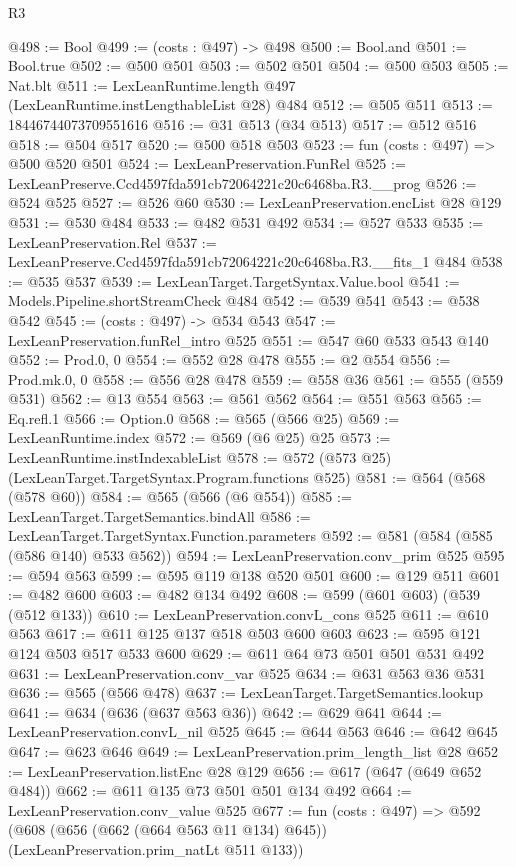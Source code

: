 \begin{lexlean}{R3}
\begin{coremodule}
@498 := Bool
@499 := (costs : @497) -> @498
@500 := Bool.and
@501 := Bool.true
@502 := @500 @501
@503 := @502 @501
@504 := @500 @503
@505 := Nat.blt
@511 := LexLeanRuntime.length @497 (LexLeanRuntime.instLengthableList @28) @484
@512 := @505 @511
@513 := 18446744073709551616
@516 := @31 @513 (@34 @513)
@517 := @512 @516
@518 := @504 @517
@520 := @500 @518 @503
@523 := fun (costs : @497) => @500 @520 @501
@524 := LexLeanPreservation.FunRel
@525 := LexLeanPreserve.Ccd4597fda591cb72064221c20c6468ba.R3.__prog
@526 := @524 @525
@527 := @526 @60
@530 := LexLeanPreservation.encList @28 @129
@531 := @530 @484
@533 := @482 @531 @492
@534 := @527 @533
@535 := LexLeanPreservation.Rel
@537 := LexLeanPreserve.Ccd4597fda591cb72064221c20c6468ba.R3.__fits_1 @484
@538 := @535 @537
@539 := LexLeanTarget.TargetSyntax.Value.bool
@541 := Models.Pipeline.shortStreamCheck @484
@542 := @539 @541
@543 := @538 @542
@545 := (costs : @497) -> @534 @543
@547 := LexLeanPreservation.funRel_intro @525
@551 := @547 @60 @533 @543 @140
@552 := Prod.{0, 0}
@554 := @552 @28 @478
@555 := @2 @554
@556 := Prod.mk.{0, 0}
@558 := @556 @28 @478
@559 := @558 @36
@561 := @555 (@559 @531)
@562 := @13 @554
@563 := @561 @562
@564 := @551 @563
@565 := Eq.refl.{1}
@566 := Option.{0}
@568 := @565 (@566 @25)
@569 := LexLeanRuntime.index
@572 := @569 (@6 @25) @25
@573 := LexLeanRuntime.instIndexableList
@578 := @572 (@573 @25) (LexLeanTarget.TargetSyntax.Program.functions @525)
@581 := @564 (@568 (@578 @60))
@584 := @565 (@566 (@6 @554))
@585 := LexLeanTarget.TargetSemantics.bindAll
@586 := LexLeanTarget.TargetSyntax.Function.parameters
@592 := @581 (@584 (@585 (@586 @140) @533 @562))
@594 := LexLeanPreservation.conv_prim @525
@595 := @594 @563
@599 := @595 @119 @138 @520 @501
@600 := @129 @511
@601 := @482 @600
@603 := @482 @134 @492
@608 := @599 (@601 @603) (@539 (@512 @133))
@610 := LexLeanPreservation.convL_cons @525
@611 := @610 @563
@617 := @611 @125 @137 @518 @503 @600 @603
@623 := @595 @121 @124 @503 @517 @533 @600
@629 := @611 @64 @73 @501 @501 @531 @492
@631 := LexLeanPreservation.conv_var @525
@634 := @631 @563 @36 @531
@636 := @565 (@566 @478)
@637 := LexLeanTarget.TargetSemantics.lookup
@641 := @634 (@636 (@637 @563 @36))
@642 := @629 @641
@644 := LexLeanPreservation.convL_nil @525
@645 := @644 @563
@646 := @642 @645
@647 := @623 @646
@649 := LexLeanPreservation.prim_length_list @28
@652 := LexLeanPreservation.listEnc @28 @129
@656 := @617 (@647 (@649 @652 @484))
@662 := @611 @135 @73 @501 @501 @134 @492
@664 := LexLeanPreservation.conv_value @525
@677 := fun (costs : @497) =>
  @592 (@608 (@656 (@662 (@664 @563 @11 @134) @645)) (LexLeanPreservation.prim_natLt @511 @133))

\end{coremodule}
\end{lexlean}
